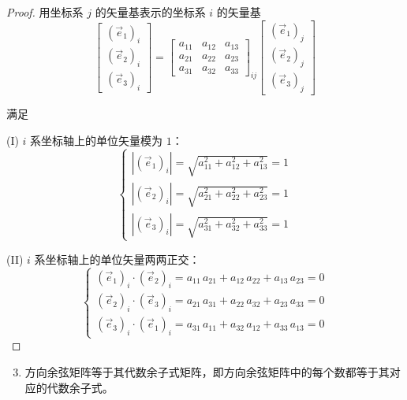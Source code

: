 \begin{proof}
用坐标系 $j$ 的矢量基表示的坐标系 $i$ 的矢量基
\begin{equation*}
\begin{bmatrix} (\vec{e}_1)_i \\ (\vec{e}_2)_i \\ (\vec{e}_3)_i \end{bmatrix} = \begin{bmatrix} a_{11} & a_{12} & a_{13} \\ a_{21} & a_{22} & a_{23} \\ a_{31} & a_{32} & a_{33} \end{bmatrix}_{\!ij} \begin{bmatrix} (\vec{e}_1)_j \\ (\vec{e}_2)_j \\ (\vec{e}_3)_j \end{bmatrix}
\end{equation*}

满足

(I) $i$ 系坐标轴上的单位矢量模为 $1$：
\begin{equation*}
\begin{cases}
|(\vec{e}_1)_i| = \sqrt{a_{11}^2 + a_{12}^2 + a_{13}^2} = 1 \\
|(\vec{e}_2)_i| = \sqrt{a_{21}^2 + a_{22}^2 + a_{23}^2} = 1 \\
|(\vec{e}_3)_i| = \sqrt{a_{31}^2 + a_{32}^2 + a_{33}^2} = 1
\end{cases}
\end{equation*}

(II) $i$ 系坐标轴上的单位矢量两两正交：
\begin{equation*}
\begin{cases}
(\vec{e}_1)_i \cdot (\vec{e}_2)_i = a_{11}\, a_{21} + a_{12}\, a_{22} + a_{13}\, a_{23} = 0 \\
(\vec{e}_2)_i \cdot (\vec{e}_3)_i = a_{21}\, a_{31} + a_{22}\, a_{32} + a_{23}\, a_{33} = 0 \\
(\vec{e}_3)_i \cdot (\vec{e}_1)_i = a_{31}\, a_{11} + a_{32}\, a_{12} + a_{33}\, a_{13} = 0
\end{cases}
\end{equation*}
\end{proof}

\begin{enumerate}\setcounter{enumi}{2}
\item 方向余弦矩阵等于其代数余子式矩阵，即方向余弦矩阵中的每个数都等于其对应的代数余子式。
\end{enumerate}

